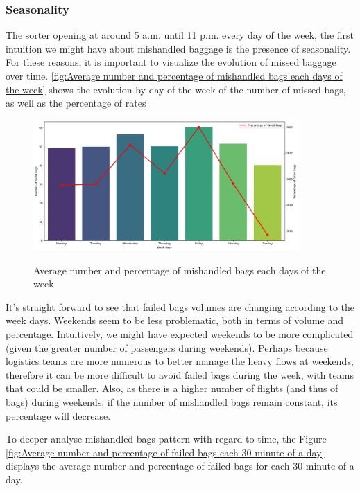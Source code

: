 \documentclass[12pt]{article}
\begin{document}
\subsubsection{Seasonality}
The sorter opening at around 5 a.m. until 11 p.m. every day of the week, the first intuition we might have about mishandled baggage is the presence of seasonality.
For these reasons, it is important to visualize the evolution of missed baggage over time. \autoref{fig:Average number and percentage of mishandled bags each days of the week}
shows the evolution by day of the week of the number of missed bags, as well as the percentage of
rates

\begin{figure}[h]
    \centering
    \includegraphics[width=0.9\textwidth]{Number and percentage of failed bags within a week.png}\\
    \caption{Average number and percentage of mishandled bags each days of the week}
    \label{fig:Average number and percentage of mishandled bags each days of the week}
\end{figure}
\FloatBarrier

It's straight forward to see that failed bags volumes are changing according to the week days. Weekends seem to be less problematic, both in terms of volume and percentage. Intuitively, we might have expected weekends to be more complicated (given the greater number of passengers during weekends). Perhaps because logistics teams are more numerous to better manage the heavy flows at weekends, therefore it can be more difficult to avoid failed bags during the week, with teams that could be smaller. Also, as there is a higher number of flights (and thus of bags) during weekends, if the number of mishandled bags remain constant, its percentage will decrease.

To deeper analyse mishandled bags pattern with regard to time, the Figure \ref{fig:Average number and percentage of failed bags each 30 minute of a day} displays the average number and percentage of failed bags for each 30 minute of a day.
\end{document}
